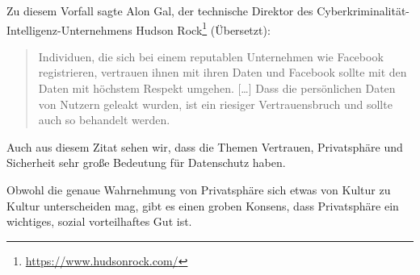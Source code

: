 Zu diesem Vorfall sagte Alon Gal, der technische Direktor des Cyberkriminalität-Intelligenz-Unternehmens Hudson Rock\footnote{\url{https://www.hudsonrock.com/}} (Übersetzt):
\blockquote[\cite{holmes_533_2021}]{
    Individuen, die sich bei einem reputablen Unternehmen wie Facebook registrieren, vertrauen ihnen mit ihren Daten
    und Facebook sollte mit den Daten mit höchstem Respekt umgehen. [\dots] 
    Dass die persönlichen Daten von Nutzern geleakt wurden, ist ein riesiger Vertrauensbruch und sollte auch so behandelt werden.
}

Auch aus diesem Zitat sehen wir, dass die Themen Vertrauen, Privatsphäre und Sicherheit sehr große Bedeutung für Datenschutz haben. 

Obwohl die genaue Wahrnehmung von Privatsphäre sich etwas von Kultur zu Kultur unterscheiden mag,
gibt es einen groben Konsens, dass Privatsphäre ein wichtiges, sozial vorteilhaftes Gut ist.\cite{lee_ethical_2016}